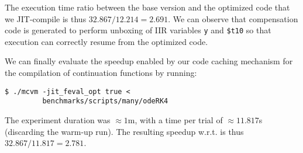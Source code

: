 \noindent The execution time ratio between the base version and the optimized code that we JIT-compile is thus $32.867/12.214=2.691$. We can observe that compensation code is generated to perform unboxing of IIR variables {\tt y} and {\tt \$t10} so that execution can correctly resume from the optimized code.

We can finally evaluate the speedup enabled by our code caching mechanism for the compilation of continuation functions by running:
\begin{small}
\begin{verbatim}
$ ./mcvm -jit_feval_opt true <
         benchmarks/scripts/many/odeRK4
\end{verbatim}
\end{small}

\noindent The experiment duration was $\approx1$m, with a time per trial of $\approx11.817$s (discarding the warm-up run). The resulting speedup w.r.t. is thus $32.867/11.817=2.781$.

